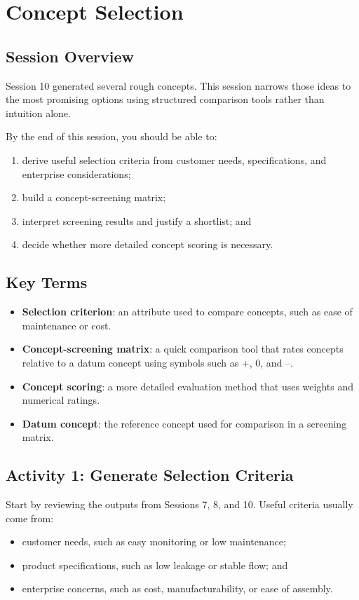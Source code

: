 \chapter{Concept Selection}

\section{Session Overview}

Session 10 generated several rough concepts. This session narrows those ideas to the most promising options using structured comparison tools rather than intuition alone.

By the end of this session, you should be able to:
\begin{enumerate}
    \item derive useful selection criteria from customer needs, specifications, and enterprise considerations;
    \item build a concept-screening matrix;
    \item interpret screening results and justify a shortlist; and
    \item decide whether more detailed concept scoring is necessary.
\end{enumerate}

\section{Key Terms}

\begin{itemize}
    \item \textbf{Selection criterion}: an attribute used to compare concepts, such as ease of maintenance or cost.
    \item \textbf{Concept-screening matrix}: a quick comparison tool that rates concepts relative to a datum concept using symbols such as +, 0, and --.
    \item \textbf{Concept scoring}: a more detailed evaluation method that uses weights and numerical ratings.
    \item \textbf{Datum concept}: the reference concept used for comparison in a screening matrix.
\end{itemize}

\section{Activity 1: Generate Selection Criteria}

Start by reviewing the outputs from Sessions 7, 8, and 10. Useful criteria usually come from:
\begin{itemize}
    \item customer needs, such as easy monitoring or low maintenance;
    \item product specifications, such as low leakage or stable flow; and
    \item enterprise concerns, such as cost, manufacturability, or ease of assembly.
\end{itemize}

